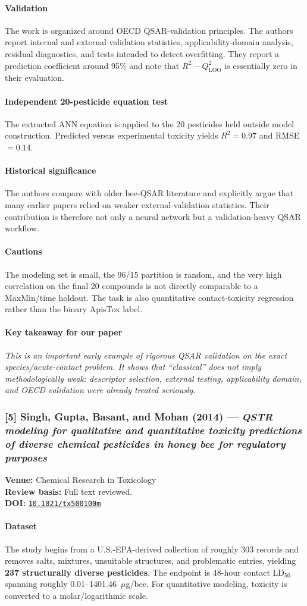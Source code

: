 \documentclass[11pt]{article}
\newcommand{\reviewfield}[2]{\paragraph{#1}#2}
\newcommand{\keytakeaway}[1]{\paragraph{Key takeaway for our paper}\emph{#1}}
\newcommand{\paperdoi}[1]{\href{https://doi.org/#1}{\texttt{#1}}}
\begin{document}
\reviewfield{Validation}{
The work is organized around OECD QSAR-validation principles. The authors report internal and external validation statistics, applicability-domain analysis, residual diagnostics, and tests intended to detect overfitting. They report a prediction coefficient around 95\% and note that $R^2-Q^2_{\mathrm{LOO}}$ is essentially zero in their evaluation.
}

\reviewfield{Independent 20-pesticide equation test}{
The extracted ANN equation is applied to the 20 pesticides held outside model construction. Predicted versus experimental toxicity yields $R^2=0.97$ and RMSE $=0.14$.
}

\reviewfield{Historical significance}{
The authors compare with older bee-QSAR literature and explicitly argue that many earlier papers relied on weaker external-validation statistics. Their contribution is therefore not only a neural network but a validation-heavy QSAR workflow.
}

\reviewfield{Cautions}{
The modeling set is small, the 96/15 partition is random, and the very high correlation on the final 20 compounds is not directly comparable to a MaxMin/time holdout. The task is also quantitative contact-toxicity regression rather than the binary ApisTox label.
}

\keytakeaway{This is an important early example of rigorous QSAR validation on the exact species/acute-contact problem. It shows that ``classical'' does not imply methodologically weak: descriptor selection, external testing, applicability domain, and OECD validation were already treated seriously.}

\subsubsection{[5] Singh, Gupta, Basant, and Mohan (2014) --- \textit{QSTR modeling for qualitative and quantitative toxicity predictions of diverse chemical pesticides in honey bee for regulatory purposes}}
\textbf{Venue:} Chemical Research in Toxicology\\
\textbf{Review basis:} Full text reviewed.\\
\textbf{DOI:} \paperdoi{10.1021/tx500100m}

\reviewfield{Dataset}{
The study begins from a U.S.-EPA-derived collection of roughly 303 records and removes salts, mixtures, unsuitable structures, and problematic entries, yielding \textbf{237 structurally diverse pesticides}. The endpoint is 48-hour contact LD$_{50}$ spanning roughly 0.01--1401.46~$\mu$g/bee. For quantitative modeling, toxicity is converted to a molar/logarithmic scale.
}
\end{document}
